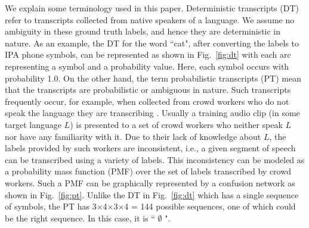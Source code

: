 \documentclass[a4paper]{article}
\begin{document}
We explain some terminology used in this paper. Deterministic transcripts (DT) refer to transcripts collected from native speakers of a language. We assume no ambiguity in these ground truth labels, and hence they are deterministic in nature. As an example, the DT for the word ``cat", after converting the labels to IPA phone symbols, can be represented as shown in Fig.~\ref{fig:dt} with each arc representing a symbol and a probability value. Here, each symbol occurs with probability 1.0. On the other hand, the term probabilistic transcripts (PT) mean that the transcripts are probabilistic or ambiguous in nature. Such transcripts frequently occur, for example, when collected from crowd workers who do not speak the language they are transcribing \cite{Jyothi-MismatchedCrowdsourcingTrans}. Usually a training audio clip (in some target language $L$) is presented to a set of crowd workers who neither speak $L$ nor have any familiarity with it. Due to their lack of knowledge about $L$, the labels provided by such workers are inconsistent, i.e., a given segment of speech can be transcribed using a variety of labels. This inconsistency can be modeled as a probability mass function (PMF) over the set of labels transcribed by crowd workers. Such a PMF can be graphically represented by a confusion network as shown in Fig.~\ref{fig:pt}. Unlike the DT in Fig.~\ref{fig:dt} which has a single sequence of symbols, the PT has 3$\times$4$\times$3$\times$4 = 144 possible sequences, one of which could be the right sequence. In this case, it is `` \ipa{\ae} $\emptyset$ ".

\end{document}
